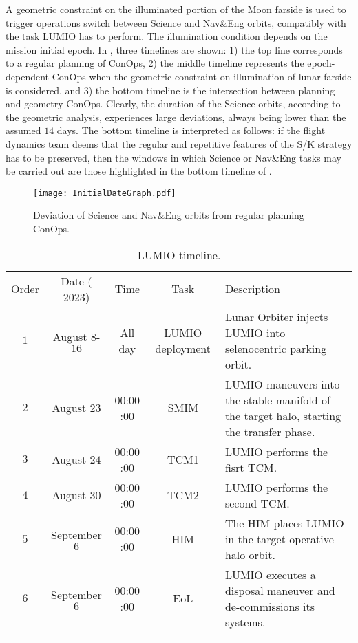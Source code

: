 A geometric constraint on the illuminated portion of the Moon farside is used to trigger operations switch between Science and Nav\&Eng orbits, compatibly with the task LUMIO has to perform. The illumination condition depends on the mission initial epoch. In , three timelines are shown: 1) the top line corresponds to a regular planning of ConOps, 2) the middle timeline represents the epoch-dependent ConOps when the geometric constraint on illumination of lunar farside is considered, and 3) the bottom timeline is the intersection between planning and geometry ConOps. Clearly, the duration of the Science orbits, according to the geometric analysis, experiences large deviations, always being lower than the assumed $14$ days. The bottom timeline is interpreted as follows: if the flight dynamics team deems that the regular and repetitive features of the S/K strategy has to be preserved, then the windows in which Science or Nav\&Eng tasks may be carried out are those highlighted in the bottom timeline of .
%
\begin{figure*}[t!]
	\centering
	\texttt{[image: InitialDateGraph.pdf]}
	\caption[Deviations from regular ConOps planning.]{Deviation of Science and Nav\&Eng orbits from regular planning ConOps.}
	\label{fig:InitialDateGraph}
\end{figure*}
%
%
\begin{table*}[h!]
	\caption{LUMIO timeline.}
	\label{tab:Timeline}
	\centering
	\footnotesize
	\begin{tabularx}{\textwidth}{ccccX}
		\TOPlines
		Order & Date ($2023$) & Time & Task & Description \\
		\MIDline
		$1$ & August $8$-$16$ & All day & LUMIO deployment & Lunar Orbiter injects LUMIO into selenocentric parking orbit. \\
		$2$ & August $23$ & $00$:$00$:$00$ & {SMIM} & LUMIO maneuvers into the stable manifold of the target halo, starting the transfer phase. \\
		$3$ & August $24$ & $00$:$00$:$00$ & TCM1 & LUMIO performs the fisrt {TCM}. \\
		$4$ & August $30$ & $00$:$00$:$00$ & TCM2 & LUMIO performs the second {TCM}. \\
		$5$ & September $6$ & $00$:$00$:$00$ & {HIM} & The {HIM} places LUMIO in the target operative halo orbit. \\
		$6$ & September $6$ & $00$:$00$:$00$ & {EoL} & LUMIO executes a disposal maneuver and de-commissions its systems. \\
		\BOTTOMlines
	\end{tabularx}
\end{table*}
%

